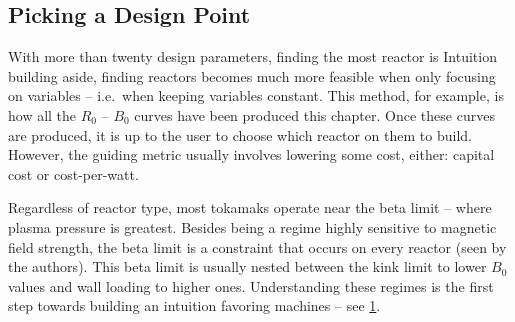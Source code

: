 \subsection{Picking a Design Point}

\label{subsection:design_point}

With more than twenty design parameters, finding the most  reactor is  Intuition building aside, finding  reactors becomes much more feasible when only focusing on  variables -- i.e.\ when keeping  variables constant. This method, for example, is how all the $R_0$ -- $B_0$ curves have been produced this chapter. Once these curves are produced, it is up to the user to choose which reactor on them to build. However, the guiding metric usually involves lowering some cost, either: capital cost or cost-per-watt.

Regardless of reactor type, most  tokamaks operate near the beta limit -- where plasma pressure is greatest. Besides being a regime highly sensitive to magnetic field strength, the beta limit is a constraint that occurs on every reactor (seen by the authors). This beta limit  is usually nested between the kink limit  to lower $B_0$ values and wall loading  to higher ones. Understanding these regimes is the first step towards building an intuition favoring  machines -- see \cref{fig:limit_regimes}.

\begin{figure}
\centering
\begin{adjustbox}{width=0.75\textwidth}
	
\end{adjustbox}
\caption{} ~ \\
\label{fig:limit_regimes}
\end{figure}

